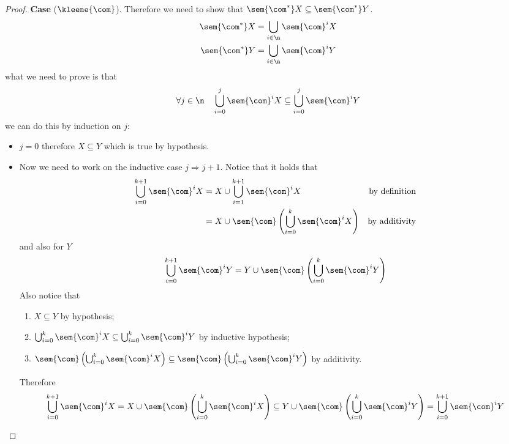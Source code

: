 \begin{proof}
  \medskip

  \noindent
  \textbf{Case} (\(\kleene{\com}\)). Therefore we need to show
  that \(\sem{\com^*}X \subseteq \sem{\com^*}Y \).
  \begin{align*}
    \sem{\com^*}X & = \bigcup_{i\in\n}\sem{\com}^i X \\
    \sem{\com^*}Y & = \bigcup_{i\in\n}\sem{\com}^i Y
  \end{align*}
  what we need to prove is that
  \[\forall j \in \n \quad \bigcup_{i=0}^j\sem{\com}^i X \subseteq
    \bigcup_{i=0}^j\sem{\com}^i Y\]
  we can do this by induction on \(j\):
  \begin{itemize}
  \item \(j=0\) therefore \(X\subseteq Y\) which is true by
    hypothesis.
  \item Now we need to work on the inductive case
    \(j \Rightarrow j+1\). Notice that it holds that
    \begin{align*}
      \bigcup_{i=0}^{k+1}\sem{\com}^i X & = X \cup \bigcup_{i=1}^{k+1}\sem{\com}^i X & \text{by definition} \\
                                        & = X \cup \sem{\com}\left(\bigcup_{i=0}^{k}\sem{\com}^i X\right) & \text{by additivity}
    \end{align*}
    and also for \(Y\)
    \begin{equation*}
      \bigcup_{i=0}^{k+1}\sem{\com}^i Y = Y \cup \sem{\com}\left(\bigcup_{i=0}^{k}\sem{\com}^i Y\right)
    \end{equation*}
    Also notice that
    \begin{enumerate}[label=(\roman*)]
    \item \(X \subseteq Y\) by hypothesis;
    \item
      \(\bigcup_{i=0}^{k}\sem{\com}^i X \subseteq
      \bigcup_{i=0}^{k}\sem{\com}^i Y\) by inductive hypothesis;
    \item 
      \(\sem{\com}\left(\bigcup_{i=0}^{k}\sem{\com}^i X\right)
      \subseteq \sem{\com}\left(\bigcup_{i=0}^{k}\sem{\com}^i
        Y\right)\) by additivity.
    \end{enumerate}
    Therefore
    \[\bigcup_{i=0}^{k+1}\sem{\com}^i X = X \cup
      \sem{\com}\left(\bigcup_{i=0}^{k}\sem{\com}^i X\right)
      \subseteq Y \cup \sem{\com}\left(\bigcup_{i=0}^{k}\sem{\com}^i
        Y\right) = \bigcup_{i=0}^{k+1}\sem{\com}^i Y \]
  \end{itemize}
\end{proof}

